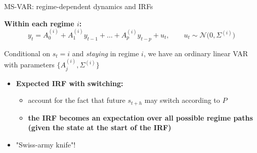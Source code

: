\documentclass{beamer}
\begin{document}
\begin{frame}{MS-VAR: regime-dependent dynamics and IRFs}
\small

\textbf{Within each regime $i$:}
\[
y_t = A_0^{(i)} + A_1^{(i)} y_{t-1} + \dots + A_p^{(i)} y_{t-p} + u_t,
\qquad u_t \sim \mathcal{N}\big(0,\Sigma^{(i)}\big)
\]

Conditional on $s_t = i$ and \emph{staying} in regime $i$,
        we have an ordinary linear VAR with parameters $\{A_j^{(i)},\Sigma^{(i)}\}$

   \begin{itemize}
  \item \textbf{Expected IRF with switching:}
        \begin{itemize}
          \item account for the fact that future $s_{t+h}$ may switch according to $P$
          \item \textbf{the IRF becomes an expectation over all possible regime paths (given the state at the start of the IRF)}
        \end{itemize}
\end{itemize}

\begin{itemize}
  \item "Swiss-army knife"!
\end{itemize}

\end{frame}
\end{document}
